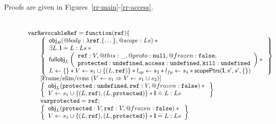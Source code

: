 \documentclass[a4paper]{article}
\begin{document}
Proofs are given in Figures~\ref{rr-main}-\ref{rr-access}.

\begin{displaymath}
  \begin{array}{rcl}
\end{array}
\end{displaymath}

%
\begin{figure}
\[
  \begin{array}{l}
    \js{var RevocableRef = function(ref) \{}\\
    \begin{array}{@{\qquad}l}
      \logic{
        \obj_R(@body: \lambda\js{ref}.\{\dots\} , @scope: Ls) \sep {} \\
          \exists L \st \ls \doteq L:Ls \sep {} \\
          \fullobj_L\left(
            \begin{array}{l}
              \js{ref}: V,@this: \_,@proto: \nil,@frozen: \false,\\
              \js{protected}: \und,\js{access}: \und,\js{kill}: \und %
            \end{array}
          \right) \sep {} \\
          L \bp \{\} \sep V \bp s_1 \cup \{(L,\js{ref})\} \sep
          \lop \bp s_3 \sep \lfp \bp s_4 \sep
          \scopePtrs(\ls, s', s', \{\})
      } \\
      \step{Frame/elim/cons ($V \bp s_1 \impl V \bp s_1 \cup s_2$)} \\
      \logic{
          \obj_L(\js{protected}: \und, \js{ref}: V, @frozen: \false) \sep {} \\
          V \bp s_1 \cup \{(L,\js{ref}), (L, \js{protected})\} \sep \ls\doteq{L:Ls}
      } \\
      \js{var protected = ref;} \\
      \logic{
          \obj_L(\js{protected}: V, \js{ref}: V, @frozen: \false) \sep {} \\
          V \bp s_1 \cup \{(L,\js{ref}), (L, \js{protected})\}\sep \ls\doteq{L:Ls}
}
\end{array}
\end{array}\]
\end{figure}
\end{document}
